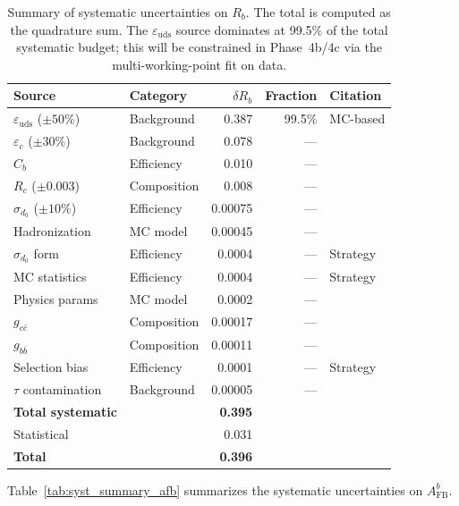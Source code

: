 \documentclass[11pt,a4paper]{article}
\begin{document}
\begin{table}[htbp]
\centering
\caption{Summary of systematic uncertainties on $R_b$. The total is computed as
the quadrature sum. The $\varepsilon_\mathrm{uds}$ source dominates at 99.5\% of
the total systematic budget; this will be constrained in Phase~4b/4c via the
multi-working-point fit on data.}
\label{tab:syst_summary_rb}
\small
\begin{tabular}{llrrl}
\toprule
Source & Category & $\delta R_b$ & Fraction & Citation \\
\midrule
$\varepsilon_\mathrm{uds}$ ($\pm 50\%$) & Background & 0.387 & 99.5\% & MC-based \\
$\varepsilon_c$ ($\pm 30\%$) & Background & 0.078 & --- & \cite{LEP:HF:2001} \\
$C_b$ & Efficiency & 0.010 & --- & \cite{ALEPH:Rb:1996} \\
$R_c$ ($\pm 0.003$) & Composition & 0.008 & --- & \cite{LEP:EWWG:2005} \\
$\sigma_{d_0}$ ($\pm 10\%$) & Efficiency & 0.00075 & --- & \cite{ALEPH:Rb:1996} \\
Hadronization & MC model & 0.00045 & --- & \cite{ALEPH:Rb:1996} \\
$\sigma_{d_0}$ form & Efficiency & 0.0004 & --- & Strategy \\
MC statistics & Efficiency & 0.0004 & --- & Strategy \\
Physics params & MC model & 0.0002 & --- & \cite{PDG:2024} \\
$g_{c\bar{c}}$ & Composition & 0.00017 & --- & \cite{LEP:gcc} \\
$g_{b\bar{b}}$ & Composition & 0.00011 & --- & \cite{LEP:HF:2001} \\
Selection bias & Efficiency & 0.0001 & --- & Strategy \\
$\tau$ contamination & Background & 0.00005 & --- & \cite{ALEPH:sigma_had} \\
\midrule
\textbf{Total systematic} & & \textbf{0.395} & & \\
Statistical & & 0.031 & & \\
\midrule
\textbf{Total} & & \textbf{0.396} & & \\
\bottomrule
\end{tabular}
\end{table}

Table~\ref{tab:syst_summary_afb} summarizes the systematic uncertainties on $A_\mathrm{FB}^b$.
\end{document}
